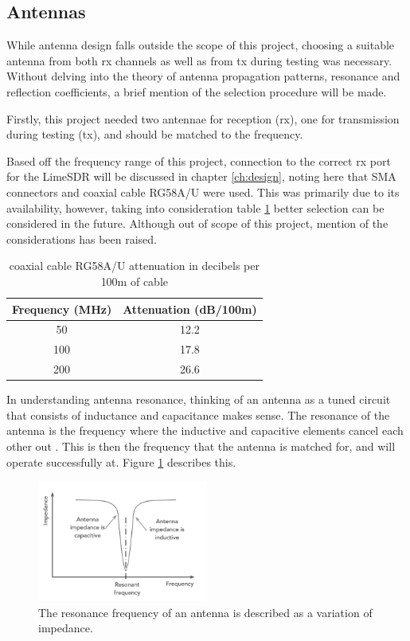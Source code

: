 \documentclass[class=report,11pt,crop=false]{standalone}
\begin{document}
\subsection{Antennas}
While antenna design falls outside the scope of this project, choosing a suitable antenna from both \gls{rx} channels as well as from \gls{tx} during testing was necessary. Without delving into the theory of antenna propagation patterns, resonance and reflection coefficients, a brief mention of the selection procedure will be made.

Firstly, this project needed two antennae for reception (\gls{rx}), one for transmission during testing (\gls{tx}), and should be matched to the frequency. 

Based off the frequency range of this project, connection to the correct \gls{rx} port for the LimeSDR will be discussed in chapter \ref{ch:design}, noting here that SMA connectors and coaxial cable RG58A/U were used. This was primarily due to its availability, however, taking into consideration table \ref{tab:coax} better selection can be considered in the future. Although out of scope of this project, mention of the considerations has been raised.

\begin{table}[h]
    \centering
    \begin{tabular}{c|c}
        Frequency (MHz)  & Attenuation (dB/100m)  \\
        \hline
        50 & 12.2\\
        100 & 17.8\\
        200 & 26.6\\
    \end{tabular}
    \caption{coaxial cable RG58A/U attenuation in decibels per 100m of cable}
    \label{tab:coax}
\end{table}

In understanding antenna resonance, thinking of an antenna as a tuned circuit that consists of inductance and capacitance makes sense. The resonance of the antenna is the frequency where the inductive and capacitive elements cancel each other out \cite{antenna}. This is then the frequency that the antenna is matched for, and will operate successfully at. Figure \ref{fig:antenna_resonance} describes this.

\begin{figure}[h]
    \centering
    \includegraphics[width=0.5\textwidth]{Images/diagrams/antenna_resonance.png}
    \caption{The resonance frequency of an antenna is described as a variation of impedance.}
    \label{fig:antenna_resonance}
\end{figure}
\end{document}
